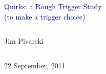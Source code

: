 \documentclass[compress]{beamer}
\begin{document}
\begin{frame}
\vfill
\begin{center}
\textcolor{darkblue}{\Large Quirks: a Rough Trigger Study \\ \vspace{0.2 cm} (to make a trigger choice)}

\vfill
\begin{columns}
\begin{center}
\large
Jim Pivarski
\end{center}
\end{columns}


\vfill
22 September, 2011

\end{center}
\end{frame}


\small
\end{document}
